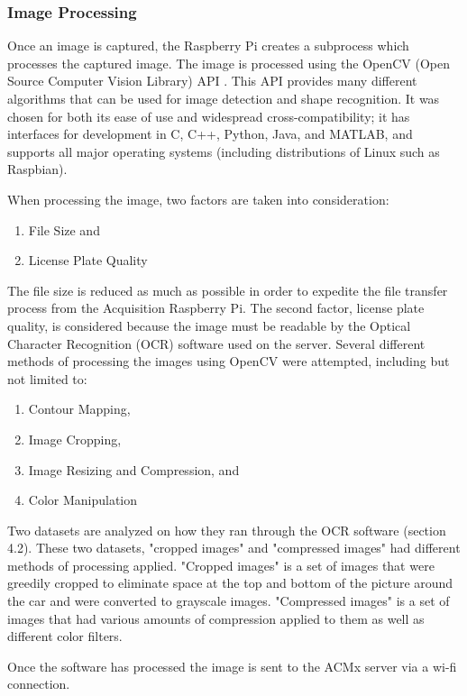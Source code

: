 \documentclass[11pt, oneside, fullpage, doublespace]{article}
\begin{document}
\subsubsection{Image Processing}
Once an image is captured, the Raspberry Pi creates a subprocess which processes the captured image. The image is processed using the OpenCV (Open Source Computer Vision Library) API \cite{openCV}. This API provides many different algorithms that can be used for image detection and shape recognition. It was chosen for both its ease of use and widespread cross-compatibility; it has interfaces for development in C, C++, Python, Java, and MATLAB, and supports all major operating systems (including distributions of Linux such as Raspbian). 

When processing the image, two factors are taken into consideration:
\begin{enumerate}
\item File Size and
\item License Plate Quality
\end{enumerate}
The file size is reduced as much as possible in order to expedite the file transfer process from the Acquisition Raspberry Pi. The second factor, license plate quality, is considered because the image must be readable by the Optical Character Recognition (OCR) software used on the server. Several different methods of processing the images using OpenCV were attempted, including but not limited to:
\begin{enumerate}
\item Contour Mapping,
\item Image Cropping,
\item Image Resizing and Compression, and
\item Color Manipulation
\end{enumerate}

Two datasets are analyzed on how they ran through the OCR software (section 4.2). These two datasets, "cropped images" and "compressed images" had different methods of processing applied. "Cropped images" is a set of images that were greedily cropped to eliminate space at the top and bottom of the picture around the car and were converted to grayscale images. "Compressed images" is a set of images that had various amounts of compression applied to them as well as different color filters.

Once the software has processed the image is sent to the ACMx server via a wi-fi connection.
\end{document}
